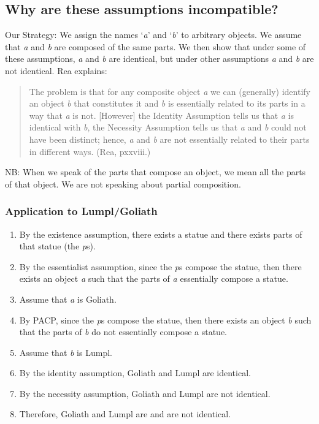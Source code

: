 \documentclass[oneside]{article}
\begin{document}
\subsection*{Why are these assumptions incompatible?} 

Our Strategy: We assign the names `\emph{a}' and `\emph{b}' to arbitrary objects. We assume  that \emph{a} and \emph{b} are composed of the same parts. We then show that under some of these assumptions, \emph{a} and \emph{b} are identical, but under other assumptions \emph{a} and  \emph{b} are not identical. Rea explains: 
\begin{quote}The problem is that for any composite object \emph{a} we can (generally) identify an object \emph{b} that constitutes it and \emph{b} is essentially related to its parts in a way that \emph{a} is not. [However] the  Identity Assumption tells us that \emph{a} is identical with \emph{b}, the Necessity Assumption tells us that \emph{a} and \emph{b} could not have been distinct; hence, \emph{a} and \emph{b} are not essentially related to their parts in different ways. (Rea, pxxviii.) 
\end{quote}
NB: When we speak of the parts that compose an object, we mean all the parts of  that object. We are not speaking about partial composition.

\subsubsection*{Application to Lumpl/Goliath} 
\begin{enumerate}
\item By the existence assumption, there exists a statue and there exists parts of that  statue (the \emph{p}s). 
\item By the essentialist assumption, since the \emph{p}s compose the statue, then there  exists an object \emph{a} such that the parts of \emph{a} essentially compose a statue. 
\item Assume that \emph{a} is Goliath. 
\item By PACP, since the \emph{p}s compose the statue, then there exists an object \emph{b}  such that the parts of \emph{b} do not essentially compose a statue. 
\item Assume that \emph{b} is Lumpl. 
\item By the identity assumption, Goliath and Lumpl are identical. 
\item By the necessity assumption, Goliath and Lumpl are not identical. 
\item Therefore, Goliath and Lumpl are and are not identical. 
\end{enumerate}
\end{document}
